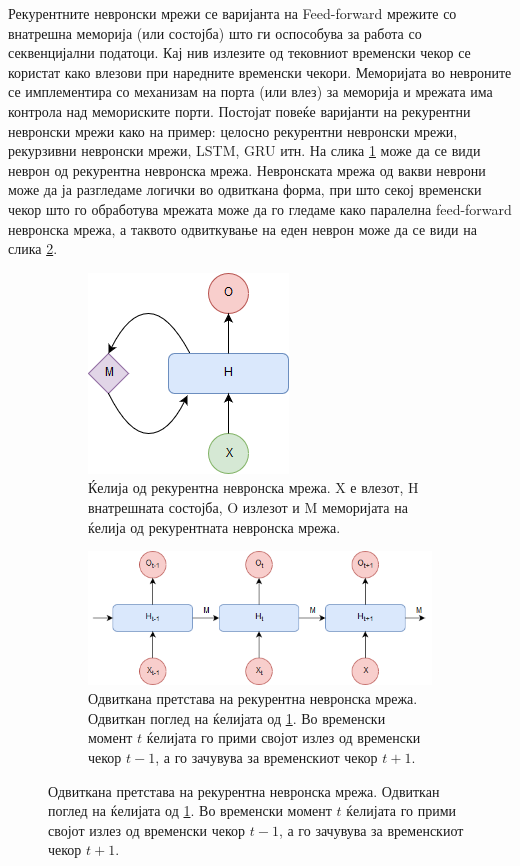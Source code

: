 Рекурентните невронски мрежи се варијанта на Feed-forward мрежите со внатрешна меморија (или состојба) што ги оспособува за работа со секвенцијални податоци. Кај нив излезите од тековниот временски чекор се користат како влезови при наредните временски чекори. Меморијата во невроните се имплементира со механизам на порта (или влез) за меморија и мрежата има контрола над мемориските порти. Постојат повеќе варијанти на рекурентни невронски мрежи како на пример: целосно рекурентни невронски мрежи, рекурзивни невронски мрежи, LSTM, GRU итн. На слика \ref{fig:rnn_folded} може да се види неврон од рекурентна невронска мрежа. Невронската мрежа од вакви неврони може да ја разгледаме логички во одвиткана форма, при што секој временски чекор што го обработува мрежата може да го гледаме како паралелна feed-forward невронска мрежа, а таквото одвиткување на еден неврон може да се види на слика \ref{fig:rnn_unfolded}.

\begin{figure}[H]
	\centering
	\caption{Рекурентна невронска мрежа.}
    \begin{subfigure}[t]{1\linewidth} 
        \centering\includegraphics[width=.3\linewidth]{images/rnn_folded.png}
        \caption{Ќелија од рекурентна невронска мрежа. X е влезот, H внатрешната состојба, O излезот и M меморијата на ќелија од рекурентната невронска мрежа.}	
        \label{fig:rnn_folded}
    \end{subfigure}
    \begin{subfigure}[t]{1\linewidth}       
        \centering\includegraphics[width=.7\linewidth]{images/rnn_unfolded.png}
        \caption{Одвиткана претстава на рекурентна невронска мрежа. Одвиткан поглед на ќелијата од \ref{fig:rnn_folded}. Во временски момент $t$ ќелијата го прими својот излез од временски чекор $t-1$, а го зачувува за временскиот чекор $t+1$.}
        \label{fig:rnn_unfolded}
    \end{subfigure}
	\label{fig:rnn}
\end{figure}

